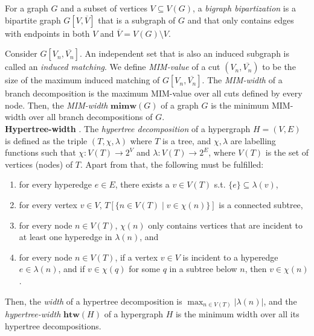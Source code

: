 \documentclass{article}
\begin{document}
For a graph $G$ and a subset of vertices $V \subseteq V(G)$, a {\em bigraph bipartization} is a bipartite graph $G[V, \overline{V}]$ that is a subgraph of $G$ and that only contains edges with endpoints in both $V$ and $\overline{V} = V(G) \setminus V$.

Consider $G[V_n, \overline{V_n}]$.
An independent set that is also an induced subgraph is called an {\em induced matching}.
We define {\em MIM-value} of a cut $(V_n, \overline{V_n})$ to be the size of the maximum induced matching of $G[V_n, \overline{V_n}]$.
The {\em MIM-width} of a branch decomposition is the maximum MIM-value over all cuts defined by every node.
Then, the {\em MIM-width} $\mathbf{mimw}(G)$ of a graph $G$ is the minimum MIM-width over all branch decompositions of $G$.\\

\noindent
\textbf{Hypertree-width} \cite{DBLP:journals/siamcomp/GottlobP04}.
The {\em hypertree decomposition} of a hypergraph $H=(V,E)$ is defined as the triple $(T, \chi, \lambda)$ where $T$ is a tree, and $\chi, \lambda$ are labelling functions such that  $\chi : V(T) \rightarrow 2^V$ and $\lambda : V(T) \rightarrow 2^E$, where $V(T)$ is the set of vertices (nodes) of $T$.
Apart from that, the following must be fulfilled:
\begin{enumerate}
	\item for every hyperedge $e \in E$, there exists a $v \in V(T)$ s.t. $\{e\} \subseteq \lambda(v)$,
	\item for every vertex $v \in V$, $T[\{ n \in V(T) \; | \; v \in \chi(n) \}]$ is a connected subtree,
	\item for every node $n \in V(T)$, $\chi(n)$ only contains vertices that are incident to at least one hyperedge in $\lambda(n)$, and
	\item for every node $n \in V(T)$, if a vertex $v \in V$ is incident to a hyperedge $e \in \lambda(n)$, and if $v \in \chi(q)$ for some $q$ in a subtree below $n$, then $v\in \chi(n)$.
\end{enumerate}
Then, the {\em width} of a hypertree decomposition is $\max_{n \in V(T)} |\lambda(n)|$, and the {\em hypertree-width} $\mathbf{htw}(H)$ of a hypergraph $H$ is the minimum width over all its hypertree decompositions. \\
\end{document}
